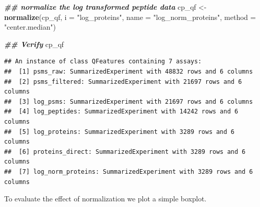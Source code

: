 \documentclass[9pt,a4paper,]{extarticle}
\newenvironment{Shaded}{\begin{snugshade}}{\end{snugshade}}
\newcommand{\AttributeTok}[1]{\textcolor[rgb]{0.13,0.29,0.53}{#1}}
\newcommand{\DocumentationTok}[1]{\textcolor[rgb]{0.56,0.35,0.01}{\textbf{\textit{#1}}}}
\newcommand{\FunctionTok}[1]{\textcolor[rgb]{0.13,0.29,0.53}{\textbf{#1}}}
\newcommand{\NormalTok}[1]{#1}
\newcommand{\OtherTok}[1]{\textcolor[rgb]{0.56,0.35,0.01}{#1}}
\newcommand{\StringTok}[1]{\textcolor[rgb]{0.31,0.60,0.02}{#1}}
\begin{document}
\begin{Shaded}
\begin{Highlighting}[]
\DocumentationTok{\#\# normalize the log transformed peptide data}
\NormalTok{cp\_qf }\OtherTok{\textless{}{-}} \FunctionTok{normalize}\NormalTok{(cp\_qf,}
                   \AttributeTok{i =} \StringTok{"log\_proteins"}\NormalTok{,}
                   \AttributeTok{name =} \StringTok{"log\_norm\_proteins"}\NormalTok{,}
                   \AttributeTok{method =} \StringTok{"center.median"}\NormalTok{)}

\DocumentationTok{\#\# Verify}
\NormalTok{cp\_qf}
\end{Highlighting}
\end{Shaded}

\begin{verbatim}
## An instance of class QFeatures containing 7 assays:
##  [1] psms_raw: SummarizedExperiment with 48832 rows and 6 columns 
##  [2] psms_filtered: SummarizedExperiment with 21697 rows and 6 columns 
##  [3] log_psms: SummarizedExperiment with 21697 rows and 6 columns 
##  [4] log_peptides: SummarizedExperiment with 14242 rows and 6 columns 
##  [5] log_proteins: SummarizedExperiment with 3289 rows and 6 columns 
##  [6] proteins_direct: SummarizedExperiment with 3289 rows and 6 columns 
##  [7] log_norm_proteins: SummarizedExperiment with 3289 rows and 6 columns
\end{verbatim}

To evaluate the effect of normalization we plot a simple boxplot.
\end{document}
